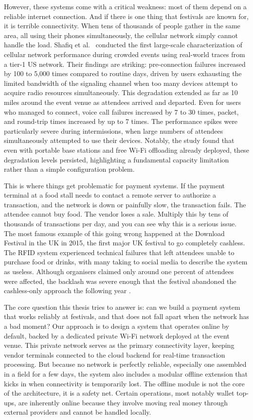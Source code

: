 However, these systems come with a critical weakness: most of them depend on a reliable internet connection. And if there is one thing that festivals are known for, it is terrible connectivity. When tens of thousands of people gather in the same area, all using their phones simultaneously, the cellular network simply cannot handle the load. Shafiq et al.~\cite{Shafiq2013} conducted the first large-scale characterization of cellular network performance during crowded events using real-world traces from a tier-1 US network. Their findings are striking: pre-connection failures increased by 100 to 5,000 times compared to routine days, driven by users exhausting the limited bandwidth of the signaling channel when too many devices attempt to acquire radio resources simultaneously. This degradation extended as far as 10 miles around the event venue as attendees arrived and departed. Even for users who managed to connect, voice call failures increased by 7 to 30 times, packet, and round-trip times increased by up to 7 times. The performance spikes were particularly severe during intermissions, when large numbers of attendees simultaneously attempted to use their devices. Notably, the study found that even with portable base stations and free Wi-Fi offloading already deployed, these degradation levels persisted, highlighting a fundamental capacity limitation rather than a simple configuration problem.


This is where things get problematic for payment systems. If the payment terminal at a food stall needs to contact a remote server to authorize a transaction, and the network is down or painfully slow, the transaction fails. The attendee cannot buy food. The vendor loses a sale. Multiply this by tens of thousands of transactions per day, and you can see why this is a serious issue. The most famous example of this going wrong happened at the Download Festival in the UK in 2015, the first major UK festival to go completely cashless. The RFID system experienced technical failures that left attendees unable to purchase food or drinks, with many taking to social media to describe the system as useless. Although organisers claimed only around one percent of attendees were affected, the backlash was severe enough that the festival abandoned the cashless-only approach the following year \cite{eFestivals2016}.

The core question this thesis tries to answer is: can we build a payment system that works reliably at festivals, and that does not fall apart when the network has a bad moment? Our approach is to design a system that operates online by default, backed by a dedicated private Wi-Fi network deployed at the event venue. This private network serves as the primary connectivity layer, keeping vendor terminals connected to the cloud backend for real-time transaction processing. But because no network is perfectly reliable, especially one assembled in a field for a few days, the system also includes a modular offline extension that kicks in when connectivity is temporarily lost. The offline module is not the core of the architecture, it is a safety net. Certain operations, most notably wallet top-ups, are inherently online because they involve moving real money through external providers and cannot be handled locally.

